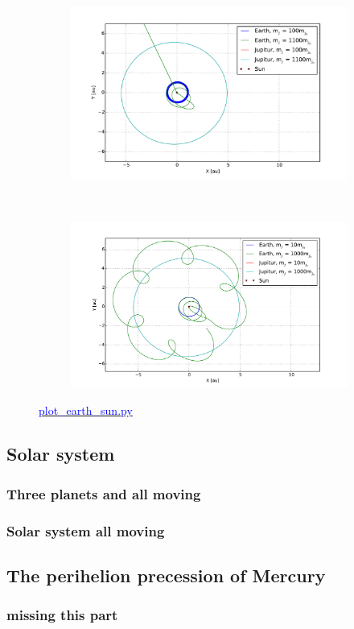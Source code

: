 \begin{figure}[H]
    \centering
    \begin{subfigure}{0.5\textwidth}
        \centering
        \includegraphics[width=\linewidth]{result/bilder/jupitur-mass-three.pdf}
    	\caption{}
    \end{subfigure}%
    ~ 
    \begin{subfigure}{0.5\textwidth}
        \centering
        \includegraphics[width=\linewidth]{result/bilder/jupitur-mass-two.pdf}
        \caption{}
    \end{subfigure}
    \caption{\href{https://github.com/erikfsk/Project-3/blob/master/Project3/3a/plot_earth_sun.py}{\textcolor{blue}{plot\_earth\_sun.py}}}
    \label{fig:three-body-varying}
\end{figure}


\subsection{Solar system}


\subsubsection{Three planets and all moving}


\subsubsection{Solar system all moving}





\subsection{The perihelion precession of Mercury}

\subsubsection{missing this part}